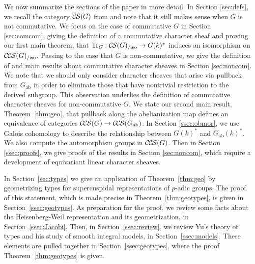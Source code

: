\documentclass[10pt]{amsart}
\theoremstyle{plain}
\theoremstyle{definition}
\newcommand{\Fq}{k}
\DeclareMathOperator{\trace}{Tr}
\newcommand{\ab}{_{\operatorname{ab}}}
\newcommand{\trFrob}[1]{t_{#1}}
\newcommand{\TrFrob}[1]{\operatorname{Tr}_{#1}}
\newcommand{\cs}[1]{{\mathcal{#1}}}
\newcommand{\CS}{{\mathcal{C\hskip-0.8pt S}}}
\newcommand{\CCS}{{\mathcal{C\hskip-.8pt C\hskip-0.8pt S}}}
\newcommand{\CSiso}[1]{\CS(#1)_{/\text{iso}}}
\newcommand{\CCSiso}[1]{\CCS(#1)_{/\text{iso}}}
\begin{document}
We now summarize the sections of the paper in more detail.
%
In Section \ref{sec:defs}, we recall the category $\CS(G)$ from \cite{cunningham-roe:13a} and note that it still makes sense when $G$ is not commutative.  
%
We focus on the case of commutative $G$ in Section \ref{sec:comcom},
giving the definition of a commutative character sheaf and proving our first main theorem, that
$\TrFrob{G} : \CSiso{G} \to G(k)^*$ induces an isomorphism on $\CCSiso{G}$.
%
Passing to the case that $G$ is non-commutative, we give the definition of and main results about commutative character sheaves in Section \ref{sec:noncom}.  
We note that we should only consider character sheaves that arise via pullback from $G\ab$ in order to eliminate those that have nontrivial restriction to the derived subgroup.  
This observation underlies the definition of commutative character sheaves for non-commutative $G$.  
We state our second main result, Theorem~\ref{thm:geo}, that pullback along the abelianization map defines an equivalence of categories $\CCS(G) \to \CCS(G\ab)$.
In Section \ref{ssec:obmor}, we use Galois cohomology to describe the relationship between $G(k)^*$ and $G\ab(k)^*$.  
We also compute the automorphism groups in $\CCS(G)$.
Then in Section \ref{ssec:proofs}, we give proofs of the results in Section \ref{sec:noncom}, which require a development of equivariant linear character sheaves.

In Section~\ref{sec:types} we give an application of Theorem~\ref{thm:geo} by geometrizing types for supercuspidal representations of $p$-adic groups. The proof of this statement, which is made precise in Theorem~\ref{thm:geotypes}, is given in Section~\ref{ssec:geotypes}. 
As preparation for the proof, we review some facts about the Heisenberg-Weil representation and its geometrization, in Section~\ref{ssec:Jacobi}.
Then, in Section~\ref{ssec:review}, we review Yu's theory of types and his study of smooth integral models, in Section~\ref{ssec:models}.  
These elements are pulled together in Section~\ref{ssec:geotypes}, where the proof Theorem~\ref{thm:geotypes} is given.

\end{document}
